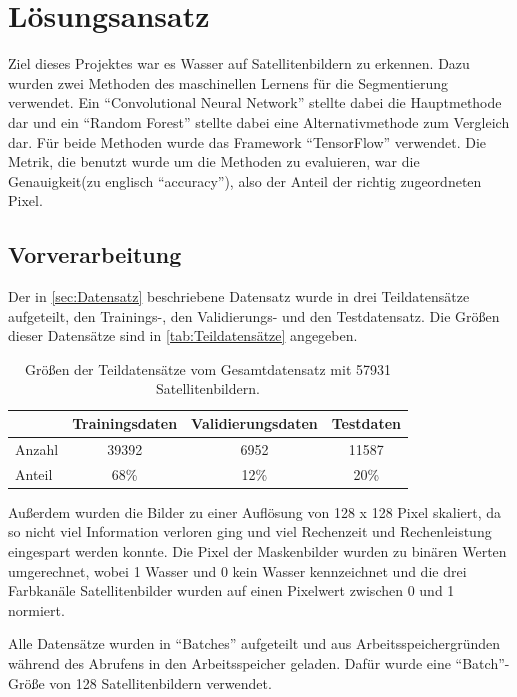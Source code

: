 \section{Lösungsansatz}
\label{sec:Lösungsansatz}

Ziel dieses Projektes war es Wasser auf Satellitenbildern zu erkennen.
Dazu wurden zwei Methoden des maschinellen Lernens für die Segmentierung verwendet.
Ein \enquote{Convolutional Neural Network} stellte dabei die Hauptmethode dar 
und ein \enquote{Random Forest} stellte dabei eine Alternativmethode zum Vergleich dar.
Für beide Methoden wurde das Framework \enquote{TensorFlow} verwendet.\cite{tensorflow}
Die Metrik, die benutzt wurde um die Methoden zu evaluieren, war die Genauigkeit(zu englisch \enquote{accuracy}), 
also der Anteil der richtig zugeordneten Pixel.

\subsection{Vorverarbeitung}
\label{ssec:Vorverarbeitung}

Der in \autoref{sec:Datensatz} beschriebene Datensatz wurde in drei Teildatensätze aufgeteilt,
den Trainings-, den Validierungs- und den Testdatensatz.
Die Größen dieser Datensätze sind in \autoref{tab:Teildatensätze} angegeben.

\begin{table}
    \centering
    \caption{Größen der Teildatensätze vom Gesamtdatensatz mit 57931 Satellitenbildern.}
    \label{tab:Teildatensätze}
    \begin{tabular}{l c c c}
        \toprule 
        & Trainingsdaten & Validierungsdaten & Testdaten \\ 
        \midrule 
        Anzahl & 39392 & 6952 & 11587 \\
        Anteil & 68\% & 12\% & 20\% \\
        \bottomrule
    \end{tabular}
\end{table}

Außerdem wurden die Bilder zu einer Auflösung von 128 x 128 Pixel skaliert, 
da so nicht viel Information verloren ging und viel Rechenzeit und Rechenleistung eingespart werden konnte.
Die Pixel der Maskenbilder wurden zu binären Werten umgerechnet, wobei 1 Wasser und 0 kein Wasser kennzeichnet
und die drei Farbkanäle Satellitenbilder wurden auf einen Pixelwert zwischen 0 und 1 normiert. 

Alle Datensätze wurden in \enquote{Batches} aufgeteilt und aus Arbeitsspeichergründen während des Abrufens in den Arbeitsspeicher geladen.
Dafür wurde eine \enquote{Batch}-Größe von 128 Satellitenbildern verwendet.

